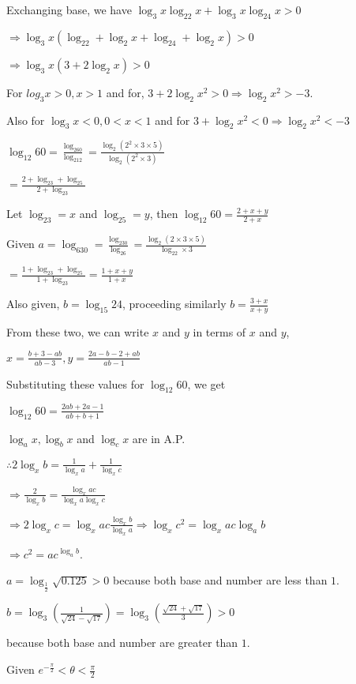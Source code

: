   Exchanging base, we have $\log_3x\log_22x + \log_3x\log_24x > 0$

  $\Rightarrow \log_3x(\log_22 + \log_2x + \log_24 + \log_2x) > 0$

  $\Rightarrow \log_3x(3 + 2\log_2x) > 0$

  For $log_3x > 0, x > 1$ and for, $3 + 2\log_2x^2 > 0 \Rightarrow \log_2x^2 > -3$.

  Also for $\log_3x < 0, 0 <x < 1$ and for $3 + \log_2x^2 < 0 \Rightarrow \log_2x^2 < -3$
\item $\log_{12}60 = \frac{\log_260}{\log_212} = \frac{\log_2(2^2\times3\times5)}{\log_2(2^2\times3)}$

  $= \frac{2 + \log_23 + \log_25}{2 + \log_23}$

  Let $\log_23 = x$ and $\log_25 = y$, then $\log_{12}60 = \frac{2 + x + y}{2 + x}$

  Given $a = \log_630 = \frac{\log_230}{\log_26} = \frac{\log_2(2\times3\times5)}{\log_22\times 3}$

  $= \frac{1 + \log_23 + \log_25}{1 + \log_23} = \frac{1 + x + y}{1 + x}$

  Also given, $b = \log_{15}24$, proceeding similarly $b = \frac{3 + x}{x + y}$

  From these two, we can write $x$ and $y$ in terms of $x$ and $y$,

  $x = \frac{b + 3 - ab}{ab -3}, y = \frac{2a - b - 2 + ab}{ab - 1}$

  Substituting these values for $\log_{12}60$, we get

  $\log_{12}60 = \frac{2ab + 2a - 1}{ab + b + 1}$
\item $\log_ax, \log_bx$ and $\log_cx$ are in A.P.

  $\therefore 2\log_xb = \frac{1}{\log_xa} + \frac{1}{\log_xc}$

  $\Rightarrow \frac{2}{\log_xb} = \frac{\log_xac}{\log_xa\log_xc}$

  $\Rightarrow 2\log_xc = \log_xac\frac{\log_xb}{\log_xa} \Rightarrow \log_xc^2 = \log_xac\log_ab$

  $\Rightarrow c^2 = ac^{\log_ab}$.
\item $a = \log_{\tfrac{1}{2}}\sqrt{0.125} > 0$ because both base and number are less than $1$.

  $b = \log_3\left(\frac{1}{\sqrt{24} - \sqrt{17}}\right) = \log_3\left(\frac{\sqrt{24} + \sqrt{17}}{3}\right) > 0$

  because both base and number are greater than $1$.
\item Given $e^{-\tfrac{\pi}{2}} < \theta < \frac{\pi}{2}$

